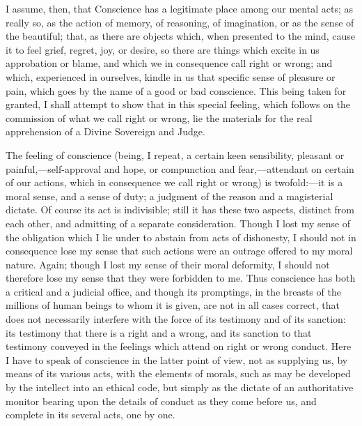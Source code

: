 I assume, then, that Conscience has a legitimate place among our
mental acts; as really so, as the action of memory, of reasoning, of
imagination, or as the sense of the beautiful; that, as there are
objects which, when presented to the mind, cause it to feel grief,
regret, joy, or desire, so there are things which excite in us
approbation or blame, and which we in consequence call right or wrong;
and which, experienced in ourselves, kindle in us that specific sense
of pleasure or pain, which goes by the name of a good or bad
conscience. This being taken for granted, I shall attempt to show that
in this special feeling, which follows on the commission of what we
call right or wrong, lie the materials for the real apprehension of a
Divine Sovereign and Judge.

The feeling of conscience (being, I repeat, a certain keen
sensibility, pleasant or painful,—self-approval and hope, or
compunction and fear,—attendant on certain of our actions, which in
consequence we call right or wrong) is twofold:—it is a moral sense,
and a sense of duty; a judgment of the reason and a magisterial
dictate. Of course its act is indivisible; still it has these
two aspects, distinct from each other, and admitting of a separate
consideration. Though I lost my sense of the obligation which I lie
under to abstain from acts of dishonesty, I should not in consequence
lose my sense that such actions were an outrage offered to my moral
nature. Again; though I lost my sense of their moral deformity, I
should not therefore lose my sense that they were forbidden to me.
Thus conscience has both a critical and a judicial office, and though
its promptings, in the breasts of the millions of human beings to whom
it is given, are not in all cases correct, that does not necessarily
interfere with the force of its testimony and of its sanction: its
testimony that there is a right and a wrong, and its sanction to that
testimony conveyed in the feelings which attend on right or wrong
conduct. Here I have to speak of conscience in the latter point of
view, not as supplying us, by means of its various acts, with the
elements of morals, such as may be developed by the intellect into an
ethical code, but simply as the dictate of an authoritative monitor
bearing upon the details of conduct as they come before us, and
complete in its several acts, one by one.

